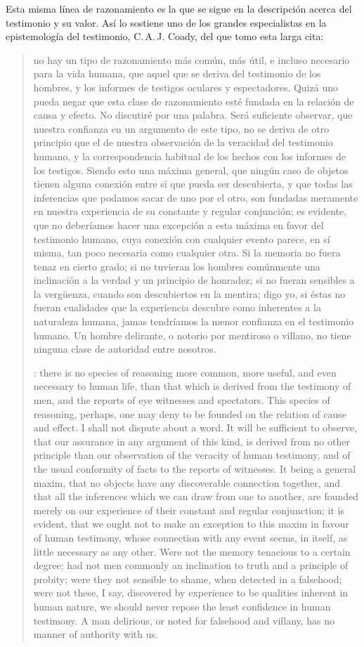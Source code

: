 Esta misma línea de razonamiento es la que se sigue en la descripción acerca del testimonio y su valor. Así lo sostiene uno de los grandes especialistas en la epistemología del testimonio, C.\,A.\,J. Coady, del que tomo esta larga cita: \blockquote[{\cite[\S10,1. 74]{hume1777enquiry}}: there is no species of reasoning more common, more useful, and even necessary to human life, than that which is derived from the testimony of men, and the reports of eye witnesses and spectators. This species of reasoning, perhaps, one may deny to be founded on the relation of cause and effect. I shall not dispute about a word. It will be sufficient to observe, that our assurance in any argument of this kind, is derived from no other principle than our observation of the veracity of human testimony, and of the usual conformity of facts to the reports of witnesses. It being a general maxim, that no objects have any discoverable connection together, and that all the inferences which we can draw from one to another, are founded merely on our experience of their constant and regular conjunction; it is evident, that we ought not to make an exception to this maxim in favour of human testimony, whose connection with any event seems, in itself, as little necessary as any other. Were not the memory tenacious to a certain degree; had not men commonly an inclination to truth and a principle of probity; were they not sensible to shame, when detected in a falsehood; were not these, I say, discovered by experience to be qualities inherent in human nature, we should never repose the least confidence in human testimony. A man delirious, or noted for falsehood and villany, has no manner of authority with us.]{no hay un tipo de razonamiento más común, más útil, e incluso necesario para la vida humana, que aquel que se deriva del testimonio de los hombres, y los informes de testigos oculares y espectadores. Quizá uno pueda negar que esta clase de razonamiento esté fundada en la relación de causa y efecto. No discutiré por una palabra. Será suficiente observar, que nuestra confianza en un argumento de este tipo, no se deriva de otro principio que el de nuestra observación de la veracidad del testimonio humano, y la correspondencia habitual de los hechos con los informes de los testigos. Siendo esto una máxima general, que ningún caso de objetos tienen alguna conexión entre sí que pueda ser descubierta, y que todas las inferencias que podamos sacar de uno por el otro, son fundadas meramente en nuestra experiencia de su constante y regular conjunción; es evidente, que no deberíamos hacer una excepción a esta máxima en favor del testimonio humano, cuya conexión con cualquier evento parece, en sí misma, tan poco necesaria como cualquier otra. Si la memoria no fuera tenaz en cierto grado; si no tuvieran los hombres comúnmente una inclinación a la verdad y un principio de honradez; si no fueran sensibles a la vergüenza, cuando son descubiertos en la mentira; digo yo, si éstas no fueran cualidades que la experiencia descubre como inherentes a la naturaleza humana, jamas tendríamos la menor confianza en el testimonio humano. Un hombre delirante, o notorio por mentiroso o villano, no tiene ninguna clase de autoridad entre nosotros.}

